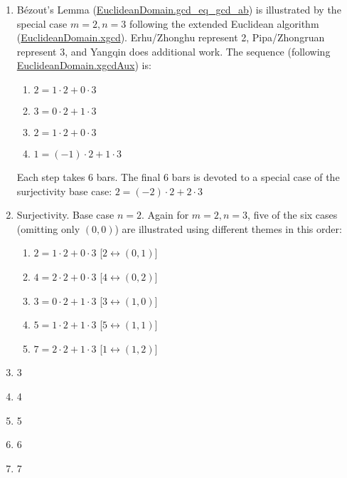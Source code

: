 \documentclass[12pt]{article}
\begin{document}
\begin{enumerate}

\item Bézout’s Lemma
  (\href{https://leanprover-community.github.io/mathlib4_docs/Mathlib/Algebra/EuclideanDomain/Basic.html#EuclideanDomain.gcd_eq_gcd_ab}{EuclideanDomain.gcd\_eq\_gcd\_ab})
  is illustrated by the special case $m = 2, n = 3$ following
  the extended Euclidean algorithm
  (\href{https://leanprover-community.github.io/mathlib4_docs/Mathlib/Algebra/EuclideanDomain/Defs.html#EuclideanDomain.xgcd}{EuclideanDomain.xgcd}).
Erhu/Zhonghu represent
2, Pipa/Zhongruan represent 3, and Yangqin does additional work. The
sequence (following
\href{https://leanprover-community.github.io/mathlib4_docs/Mathlib/Algebra/EuclideanDomain/Defs.html#EuclideanDomain.xgcdAux}{EuclideanDomain.xgcdAux}) is:

\begin{enumerate}
\item $2 = 1\cdot 2 + 0\cdot 3$
\item $3 = 0\cdot 2 + 1\cdot 3$
\item $2 = 1\cdot 2 + 0\cdot 3$
\item $1 = (-1)\cdot 2 + 1\cdot 3$
\end{enumerate}

Each step takes 6 bars. The final 6 bars is devoted to a special case
of the surjectivity base case: $2 = (-2)\cdot 2 + 2\cdot 3$

\item Surjectivity. Base case $n=2$.
Again for $m = 2, n = 3$, five of the six cases (omitting only
  $(0,0)$) are illustrated using different themes in this order:

\begin{enumerate}
\item $2 = 1\cdot 2 + 0\cdot 3$ [$2 \leftrightarrow (0,1)]$
\item $4 = 2\cdot 2 + 0\cdot 3$ [$4 \leftrightarrow (0,2)]$
\item $3 = 0\cdot 2 + 1\cdot 3$ [$3 \leftrightarrow (1,0)]$
\item $5 = 1\cdot 2 + 1\cdot 3$ [$5 \leftrightarrow (1,1)]$
\item $7 = 2\cdot 2 + 1\cdot 3$ [$1 \leftrightarrow (1,2)]$
\end{enumerate}

\item 3
\item 4
\item 5
\item 6
\item 7

\end{enumerate}
\end{document}
